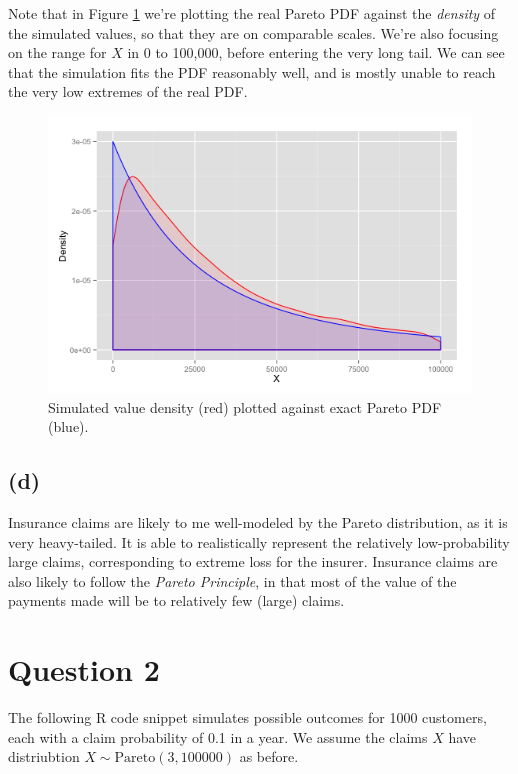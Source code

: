 \documentclass{article}
\begin{document}
Note that in Figure \ref{fig:q1c_histogram} we're plotting the real
Pareto PDF against the \emph{density} of the simulated values, so that
they are on comparable scales. We're also focusing on the range for
$X$ in 0 to 100,000, before entering the very long tail. We can see
that the simulation fits the PDF reasonably well, and is mostly unable
to reach the very low extremes of the real PDF.

\begin{figure}
  \includegraphics[width=\textwidth]{q1c_histogram}
  \caption{Simulated value density (red) plotted against exact Pareto
    PDF (blue).}
  \centering
  \label{fig:q1c_histogram}
\end{figure}

\subsection*{(d)}

Insurance claims are likely to me well-modeled by the Pareto
distribution, as it is very heavy-tailed. It is able to realistically
represent the relatively low-probability large claims, corresponding to
extreme loss for the insurer. Insurance claims are also likely to
follow the \emph{Pareto Principle}, in that most of the value of the
payments made will be to relatively few (large) claims.

\section*{Question 2}

The following R code snippet simulates possible outcomes for 1000
customers, each with a claim probability of 0.1 in a year. We assume
the claims $X$ have distriubtion $X \sim \mathrm{Pareto}(3, 100000)$
as before.
\end{document}
